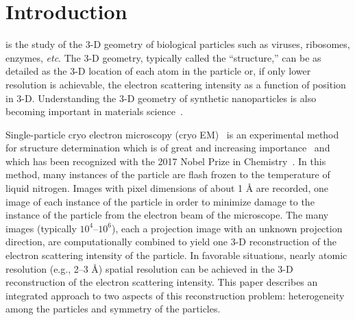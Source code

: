 \section{Introduction}
\label{sec:introduction}
 is the study of the 3-D geometry
of biological particles such as viruses, ribosomes, enzymes, {\em
  etc}.
The 3-D geometry, typically called the ``structure,'' can be as detailed as
the 3-D location of each atom in the particle or, if only lower resolution
is achievable, the electron scattering intensity as a function of
position in 3-D.
Understanding the 3-D geometry of synthetic nanoparticles is also becoming
important in materials
science~\cite{MaGongAubertTurkerKaoDoerschukWiesnerNature2018}.
\par
Single-particle cryo electron microscopy (cryo
EM)~\cite{JensenMethodsEnzymologyABC2010} is an experimental method for
structure determination which is of great and increasing
importance~\cite{SubramaniamKuhlbrandtHendersonRecentAdvancesInCryoEMIUCrJ2016}
and which has been recognized with the 2017 Nobel Prize in
Chemistry~\cite{nobelprizechemistry2017}.
In this method,
many instances of the particle are flash frozen to the temperature of
liquid nitrogen.
Images with pixel dimensions of about 1 {\AA} are recorded, one image
of each instance of the particle in order to minimize damage to
the instance of the particle from the electron beam of the microscope.
The many images (typically $10^4$--$10^6$), each a projection image with an
unknown projection direction, are computationally combined to
yield one 3-D reconstruction of the electron scattering intensity of the
particle.
In favorable situations, nearly atomic resolution (e.g., 2--3 {\AA})
spatial resolution can be achieved in the 3-D reconstruction of the
electron scattering intensity.
This paper describes an integrated approach to two aspects of this
reconstruction problem: heterogeneity among the particles and symmetry of
the particles.
